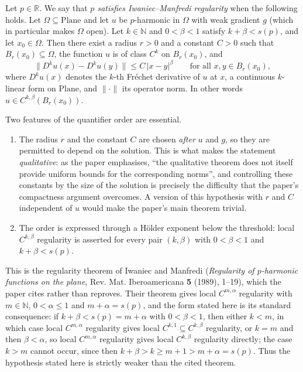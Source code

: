 \begin{definition}
Let $p\in\mathbb{R}$.  We say that \emph{$p$ satisfies Iwaniec--Manfredi regularity} when the
following holds.  Let $\Omega\subseteq\mathrm{Plane}$ and let $u$ be $p$-harmonic in
$\Omega$ with weak gradient $g$ (which in particular makes $\Omega$ open).  Let
$k\in\mathbb{N}$ and $0<\beta<1$ satisfy
$k+\beta<s(p)$, and let $x_0\in\Omega$.  Then there exist a radius $r>0$ and a constant
$C>0$ such that $B_r(x_0)\subseteq\Omega$, the function $u$ is of class $C^{k}$ on
$B_r(x_0)$, and
\[
  \bigl\lVert D^ku(x)-D^ku(y)\bigr\rVert\le C\,\lvert x-y\rvert^{\beta}
  \qquad\text{for all }x,y\in B_r(x_0),
\]
where $D^ku(x)$ denotes the $k$-th Fr\'echet derivative of $u$ at $x$, a continuous
$k$-linear form on $\mathrm{Plane}$, and $\lVert\cdot\rVert$ its operator norm.  In other
words $u\in C^{k,\beta}(B_r(x_0))$.

Two features of the quantifier order are essential.
\begin{enumerate}
\item The radius $r$ and the constant $C$ are chosen \emph{after} $u$ and $g$, so they are
permitted to depend on the solution.  This is what makes the statement \emph{qualitative}:
as the paper emphasises, ``the qualitative theorem does not itself provide uniform bounds for
the corresponding norms'', and controlling these constants by the size of the solution is
precisely the difficulty that the paper's compactness argument overcomes.  A version of this
hypothesis with $r$ and $C$ independent of $u$ would make the paper's main theorem trivial.
\item The order is expressed through a H\"older exponent below the threshold: local
$C^{k,\beta}$ regularity is asserted for every pair $(k,\beta)$ with $0<\beta<1$ and
$k+\beta<s(p)$.
\end{enumerate}

This is the regularity theorem of Iwaniec and Manfredi (\emph{Regularity of $p$-harmonic
functions on the plane}, Rev. Mat. Iberoamericana \textbf{5} (1989), 1--19), which the paper
cites rather than reproves.  Their theorem gives local $C^{m,\alpha}$ regularity with
$m\in\mathbb{N}$, $0<\alpha\le1$ and $m+\alpha=s(p)$, and the form stated here is its
standard consequence: if $k+\beta<s(p)=m+\alpha$ with $0<\beta<1$, then either $k<m$, in
which case local $C^{m,\alpha}$ regularity gives local $C^{k,1}\subseteq C^{k,\beta}$
regularity, or $k=m$ and then $\beta<\alpha$, so local $C^{m,\alpha}$ regularity gives local
$C^{k,\beta}$ regularity directly; the case $k>m$ cannot occur, since then
$k+\beta>k\ge m+1>m+\alpha=s(p)$.  Thus the hypothesis stated here is strictly weaker than
the cited theorem.
\end{definition}
